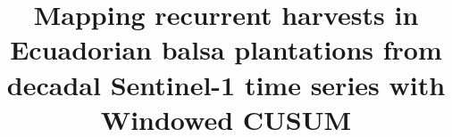 \documentclass[a4paper,fleqn]{cas-sc}
\begin{document}

\title[mode=title]{Mapping recurrent harvests in Ecuadorian balsa plantations from decadal Sentinel-1 time series with Windowed CUSUM}

\end{document}
